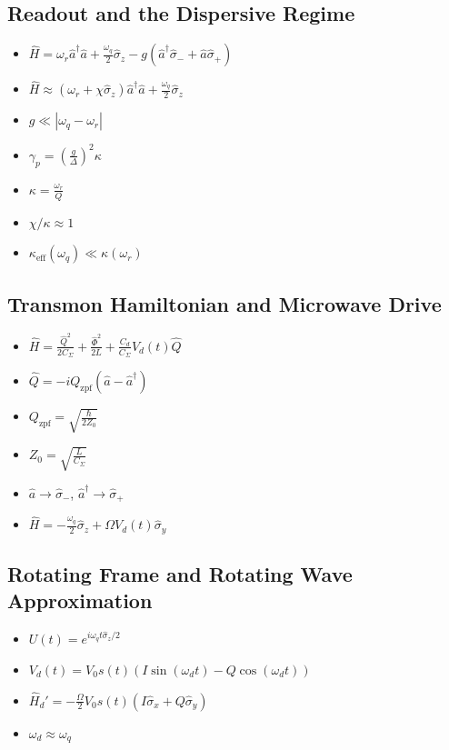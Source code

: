 \documentclass{article}
\begin{document}
\subsection*{Readout and the Dispersive Regime}
\begin{itemize}
    \item $\hat{H} = \omega_r \hat{a}^\dagger \hat{a} + \frac{\omega_q}{2} \hat{\sigma}_z - g(\hat{a}^\dagger \hat{\sigma}_- + \hat{a} \hat{\sigma}_+)$
    \item $\hat{H} \approx (\omega_r + \chi \hat{\sigma}_z) \hat{a}^\dagger \hat{a} + \frac{\omega_q}{2} \hat{\sigma}_z$
    \item $g \ll |\omega_q - \omega_r|$
    \item $\gamma_p = \left(\frac{g}{\Delta}\right)^2 \kappa$
    \item $\kappa = \frac{\omega_r}{Q}$
    \item $\chi/\kappa \approx 1$
    \item $\kappa_{\text{eff}}(\omega_q) \ll \kappa(\omega_r)$
\end{itemize}

\subsection*{Transmon Hamiltonian and Microwave Drive}
\begin{itemize}
    \item $\hat{H} = \frac{\hat{Q}^2}{2C_\Sigma} + \frac{\hat{\Phi}^2}{2L} + \frac{C_d}{C_\Sigma} V_d(t) \hat{Q}$
    \item $\hat{Q} = -i Q_{\text{zpf}}(\hat{a} - \hat{a}^\dagger)$
    \item $Q_{\text{zpf}} = \sqrt{\frac{\hbar}{2Z_0}}$
    \item $Z_0 = \sqrt{\frac{L}{C_\Sigma}}$
    \item $\hat{a} \to \hat{\sigma}_-$, $\hat{a}^\dagger \to \hat{\sigma}_+$
    \item $\hat{H} = -\frac{\omega_q}{2} \hat{\sigma}_z + \Omega V_d(t) \hat{\sigma}_y$
\end{itemize}

\subsection*{Rotating Frame and Rotating Wave Approximation}
\begin{itemize}
    \item $U(t) = e^{i\omega_q t \hat{\sigma}_z / 2}$
    \item $V_d(t) = V_0 s(t) (I \sin(\omega_d t) - Q \cos(\omega_d t))$
    \item $\hat{H}_d' = -\frac{\Omega}{2} V_0 s(t) (I\hat{\sigma}_x + Q\hat{\sigma}_y)$
    \item $\omega_d \approx \omega_q$
\end{itemize}
\end{document}

